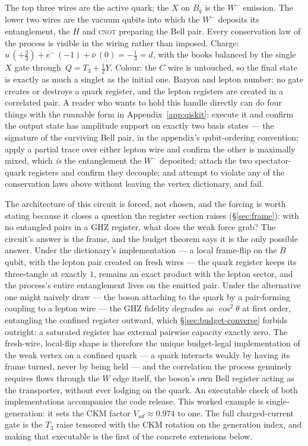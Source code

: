 The top three wires are the active quark; the $X$ on $B_q$ is the $W^-$ emission. The lower two wires
are the vacuum qubits into which the $W^-$ deposits its entanglement, the $H$ and \textsc{cnot}
preparing the Bell pair. Every conservation law of the process is visible in the wiring rather than
imposed. Charge: $u\,(+\tfrac23) + e^-\,(-1) + \bar\nu\,(0) = -\tfrac13 = d$, with the books
balanced by the single $X$ gate through~$Q = T_3 + \tfrac12 Y$. Colour: the $C$ wire is untouched,
so the final state is exactly as much a singlet as the initial one. Baryon and lepton number: no
gate creates or destroys a quark register, and the lepton registers are created in a correlated
pair. A reader who wants to hold this handle directly can do four things with the runnable form in
Appendix~\ref{app:qiskit}: execute it and confirm the output state has amplitude support on exactly
two basis states --- the signature of the surviving Bell pair, in the appendix's qubit-ordering
convention; apply a partial trace over either lepton wire and confirm the other is maximally mixed,
which \emph{is} the entanglement the $W^-$ deposited; attach the two spectator-quark registers and
confirm they decouple; and attempt to violate any of the conservation laws above without leaving the
vertex dictionary, and fail.

The architecture of this circuit is forced, not chosen, and the forcing is worth stating because it
closes a question the register section raises (\S\ref{sec:frame}): with no entangled pairs in a
GHZ register, what does the weak force grab? The circuit's answer is the frame, and the budget
theorem says it is the only possible answer. Under the dictionary's implementation --- a local
frame-flip on the $B$ qubit, with the lepton pair created on fresh wires --- the quark register
keeps its three-tangle at exactly $1$, remains an exact product with the lepton sector, and the
process's entire entanglement lives on the emitted pair. Under the alternative one might naively
draw --- the boson attaching to the quark by a pair-forming coupling to a lepton wire --- the GHZ
fidelity degrades as $\cos^2\theta$ at first order, entangling the confined register outward,
which \S\ref{sec:budget-converse} forbids outright: a saturated register has external pairwise
capacity exactly zero. The fresh-wire, local-flip shape is therefore the unique budget-legal
implementation of the weak vertex on a confined quark --- a quark interacts weakly by having its
frame turned, never by being held --- and the correlation the process genuinely requires flows
through the $W$ edge itself, the boson's own Bell register acting as the transporter, without ever
lodging on the quark. An executable check of both implementations accompanies the code release. This worked example is single-generation: it sets the CKM factor
$V_{ud}\approx0.974$ to one. The full charged-current gate is the $T_3$ raise tensored with the CKM
rotation on the generation index, and making that executable is the first of the concrete
extensions below.

